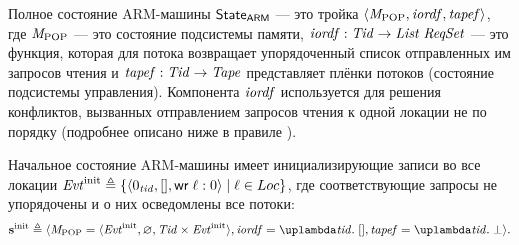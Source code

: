 Полное состояние ARM-машины $\mathsf{State}_{\mathsf{ARM}}$ --- это тройка $\langle \mathit{M}_{\mathrm{POP}}, \mathit{iordf}, \mathit{tapef} \rangle$,
где $\mathit{M}_{\mathrm{POP}}$ --- это состояние подсистемы памяти,
$\mathit{iordf} : \mathit{Tid} \rightarrow \mathit{List}\;{\mathit{ReqSet}}$ --- это функция, которая
для потока возвращает упорядоченный список отправленных им запросов чтения и
$\mathit{tapef} : \mathit{Tid} \rightarrow \mathit{Tape}$ представляет плёнки потоков (состояние подсистемы управления).
Компонента $\mathit{iordf}$ используется для решения конфликтов, вызванных
отправлением запросов чтения к одной локации не по порядку
(подробнее описано ниже в правиле ).

Начальное состояние ARM-машины имеет инициализирующие записи во все локации
$\mathit{Evt}^{\rm init} \triangleq \{ \langle 0_{\mathit{tid}}, [], {\sf wr} \; \ell:0 \rangle \mid \ell \in Loc \}$,
где соответствующие запросы не упорядочены и о них осведомлены все потоки:
\[
\sinit \triangleq
  \angled{\Mpop = \angled{\Evt^{\rm init}, \emptyset, \Tid \times \Evt^{\rm init}},
          \IssuingOrderf = \lambda \tId. \; [],
          \tapef = \lambda \tId. \; \bot}.
\]

